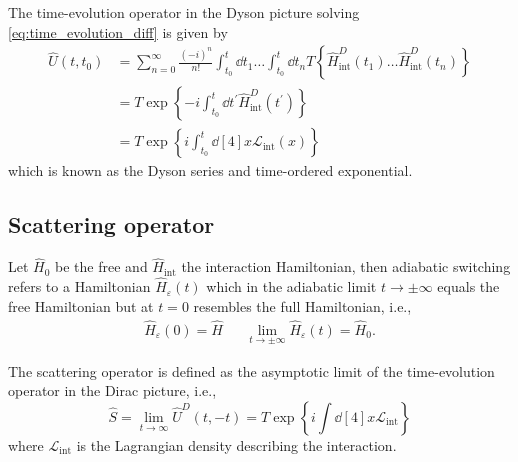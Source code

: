 \begin{theorem}\label{thm:time_evolution_exp_sol}
	The time-evolution operator in the Dyson picture solving \cref{eq:time_evolution_diff} is given by
	\begin{equation}
		\begin{split}
			\hat{U}(t,t_0)
			&=
			\sum_{n=0}^\infty
			\frac{(-i)^n}{n!}
			\int_{t_0}^t\dd{t_1}
			\dots
			\int_{t_0}^t\dd{t_n}
			T\left\{
				\hat{H}^D_\text{int}(t_1)
				\dots
				\hat{H}^D_\text{int}(t_n)
			\right\}
			\\
			&=
			T\exp\left\{
				-i
				\int_{t_0}^t
				\dd{t^\prime}
				\hat{H}^D_\text{int}(t^\prime)
			\right\}
			\\
			&=
			T\exp\left\{
				i
				\int_{t_0}^t
				\dd[4]{x}
				\mathcal{L}_\text{int}(x)
			\right\}			
		\end{split}
		\label{eq:time_evolution_sol}
	\end{equation}
	which is known as the Dyson series and time-ordered exponential.
\end{theorem}

\subsection{Scattering operator}

\begin{definition}
	Let $\hat{H}_0$ be the free and $\hat{H}_\text{int}$ the interaction Hamiltonian, then adiabatic switching refers to a Hamiltonian $\hat{H}_\varepsilon(t)$ which in the adiabatic limit $t\to\pm\infty$ equals the free Hamiltonian but at $t=0$ resembles the full Hamiltonian, i.e.,
	\begin{align}
		\hat{H}_\varepsilon(0)
		=
		\hat{H}
		&&
		\lim_{t\to\pm\infty}
		\hat{H}_\varepsilon(t)
		=
		\hat{H}_0
		.
	\end{align}
\end{definition}
\begin{definition}\label{thm:scattering_operator}
	The scattering operator is defined as the asymptotic limit of the time-evolution operator in the Dirac picture, i.e.,
	\begin{equation}
		\hat{S}
		=
		\lim_{t\to\infty}
		\hat{U}^D(t,-t)
		=
		T\exp\left\{
			i\int\dd[4]{x}
			\mathcal{L}_\text{int}
		\right\}
	\end{equation}
	where $\mathcal{L}_\text{int}$ is the Lagrangian density describing the interaction.
\end{definition}
